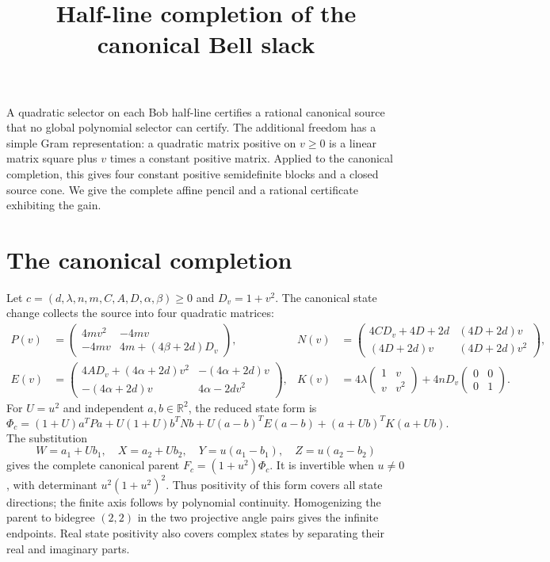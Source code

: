 \documentclass[11pt]{article}
\title{Half-line completion of the canonical Bell slack}
\author{}\date{}
\begin{document}
\maketitle
\vspace{-2em}

A quadratic selector on each Bob half-line certifies a rational canonical
source that no global polynomial selector can certify. The additional
freedom has a simple Gram representation: a quadratic matrix positive on
$v\ge0$ is a linear matrix square plus $v$ times a constant positive matrix.
Applied to the canonical completion, this gives four constant positive
semidefinite blocks and a closed source cone. We give the complete affine
pencil and a rational certificate exhibiting the gain.

\section{The canonical completion}

Let $c=(d,\lambda,n,m,C,A,D,\alpha,\beta)\ge0$ and $D_v=1+v^2$.
The canonical state change collects the source into four quadratic matrices:
\begin{align*}
 P(v)&=\begin{pmatrix}4mv^2&-4mv\\-4mv&4m+(4\beta+2d)D_v\end{pmatrix},&
 N(v)&=\begin{pmatrix}4CD_v+4D+2d&(4D+2d)v\\(4D+2d)v&(4D+2d)v^2\end{pmatrix},\\
 E(v)&=\begin{pmatrix}4AD_v+(4\alpha+2d)v^2&-(4\alpha+2d)v\\
              -(4\alpha+2d)v&4\alpha-2dv^2\end{pmatrix},&
 K(v)&=4\lambda\begin{pmatrix}1&v\\v&v^2\end{pmatrix}
                  +4nD_v\begin{pmatrix}0&0\\0&1\end{pmatrix}.
\end{align*}
For $U=u^2$ and independent $a,b\in\mathbb R^2$, the reduced state form is
\begin{equation}
 \Phi_c=(1+U)a^TPa+U(1+U)b^TNb
             +U(a-b)^TE(a-b)+(a+Ub)^TK(a+Ub).             \label{eq:normal}
\end{equation}
The substitution
\[
 W=a_1+Ub_1,\quad X=a_2+Ub_2,\quad
 Y=u(a_1-b_1),\quad Z=u(a_2-b_2)
\]
gives the complete canonical parent $F_c=(1+u^2)\Phi_c$.
It is invertible when $u\ne0$, with determinant $u^2(1+u^2)^2$.
Thus positivity of this form covers all state directions; the finite
axis follows by polynomial continuity. Homogenizing the parent to
bidegree $(2,2)$ in the two projective angle pairs gives the infinite
endpoints. Real state positivity also covers complex states by separating
their real and imaginary parts.
\end{document}
